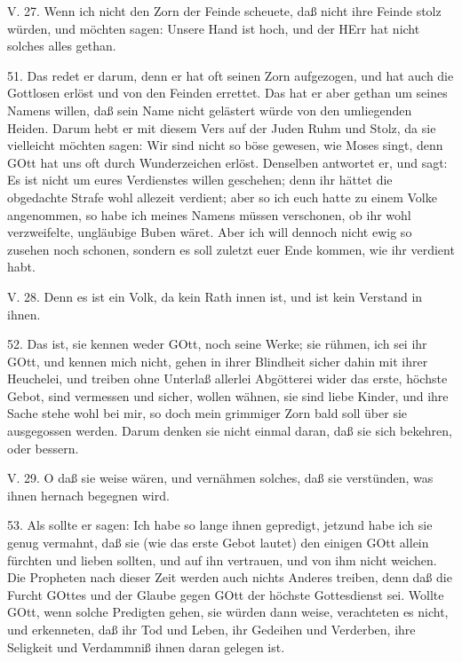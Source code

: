 \begin{schriftzitat}
V. 27. Wenn ich nicht den Zorn der Feinde scheuete, daß nicht ihre Feinde stolz würden, und möchten sagen: Unsere Hand ist hoch, und der HErr hat nicht solches alles gethan.
\end{schriftzitat}

51. Das redet er darum, denn er hat oft seinen Zorn aufgezogen, und hat auch die Gottlosen erlöst und von den Feinden errettet. Das hat er aber gethan um seines Namens willen, daß sein Name nicht gelästert würde von den umliegenden Heiden. Darum hebt er mit diesem Vers auf der Juden Ruhm und Stolz, da sie vielleicht möchten sagen: Wir sind nicht so böse gewesen, wie Moses singt, denn GOtt hat uns oft durch Wunderzeichen erlöst. Denselben antwortet er, und sagt: Es ist nicht um eures Verdienstes willen geschehen; denn ihr hättet die obgedachte Strafe wohl allezeit verdient; aber so ich euch hatte zu einem Volke angenommen, so habe ich meines Namens müssen verschonen, ob ihr wohl verzweifelte, ungläubige Buben wäret. Aber ich will dennoch nicht ewig so zusehen noch schonen, sondern es soll zuletzt euer Ende kommen, wie ihr verdient habt.

\begin{schriftzitat}
V. 28. Denn es ist ein Volk, da kein Rath innen ist, und ist kein Verstand in ihnen.
\end{schriftzitat}

52. Das ist, sie kennen weder GOtt, noch seine Werke; sie rühmen, ich sei ihr GOtt, und kennen mich nicht, gehen in ihrer Blindheit sicher dahin mit ihrer Heuchelei, und treiben ohne Unterlaß allerlei Abgötterei wider das erste, höchste Gebot, sind vermessen und sicher, wollen wähnen, sie sind liebe Kinder, und ihre Sache stehe wohl bei mir, so doch mein grimmiger Zorn bald soll über sie ausgegossen werden. Darum denken sie nicht einmal daran, daß sie sich bekehren, oder bessern.

\begin{schriftzitat}
V. 29. O daß sie weise wären, und vernähmen solches, daß sie verstünden, was ihnen hernach begegnen wird.
\end{schriftzitat}

53. Als sollte er sagen: Ich habe so lange ihnen gepredigt, jetzund habe ich sie genug vermahnt, daß sie (wie das erste Gebot lautet) den einigen GOtt allein fürchten und lieben sollten, und auf ihn vertrauen, und von ihm nicht weichen. Die Propheten nach dieser Zeit werden auch nichts Anderes treiben, denn daß die Furcht GOttes und der Glaube gegen GOtt der höchste Gottesdienst sei. Wollte GOtt, wenn solche Predigten gehen, sie würden dann weise, verachteten es nicht, und erkenneten, daß ihr Tod und Leben, ihr Gedeihen und Verderben, ihre Seligkeit und Verdammniß ihnen daran gelegen ist.

